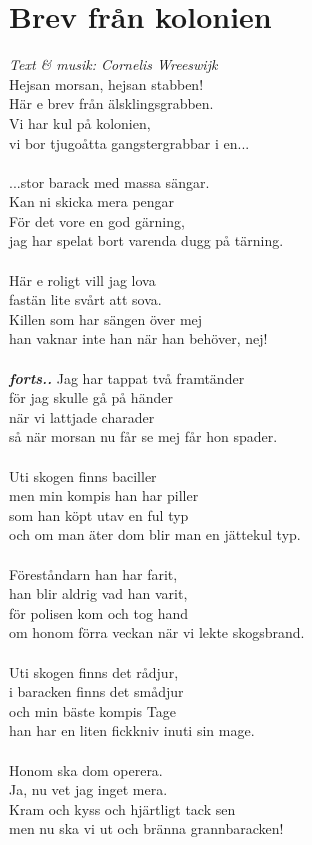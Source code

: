 \section{Brev från kolonien}
\textit{Text \& musik: Cornelis Wreeswijk}
\vspace{2mm}\\
Hejsan morsan, hejsan stabben!\\
Här e brev från älsklingsgrabben.\\
Vi har kul på kolonien,\\
vi bor tjugoåtta gangstergrabbar i en...\\
\\
...stor barack med massa sängar.\\
Kan ni skicka mera pengar\\
För det vore en god gärning,\\
jag har spelat bort varenda dugg på tärning.\\
\\
Här e roligt vill jag lova\\
fastän lite svårt att sova.\\
Killen som har sängen över mej\\
han vaknar inte han när han behöver, nej!\\
\\
\textbf{\textit{forts..}}
\newpage
\noindent Jag har tappat två framtänder\\
för jag skulle gå på händer\\
när vi lattjade charader\\
så när morsan nu får se mej får hon spader.\\
\\
Uti skogen finns baciller\\
men min kompis han har piller\\
som han köpt utav en ful typ\\
och om man äter dom blir man en jättekul typ.\\
\\
Föreståndarn han har farit,\\
han blir aldrig vad han varit,\\
för polisen kom och tog hand\\
om honom förra veckan när vi lekte skogsbrand.\\
\\
Uti skogen finns det rådjur,\\
i baracken finns det smådjur\\
och min bäste kompis Tage\\
han har en liten fickkniv inuti sin mage.\\
\\
Honom ska dom operera.\\
Ja, nu vet jag inget mera.\\
Kram och kyss och hjärtligt tack sen\\
men nu ska vi ut och bränna grannbaracken!

